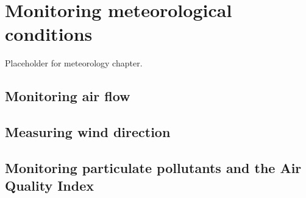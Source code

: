\setchapterpreamble[u]{\margintoc}
\chapter{\color{gray} Monitoring meteorological conditions \color{black}}

Placeholder for meteorology chapter.

\section{\color{gray} Monitoring air flow \color{black}}

\section{\color{gray} Measuring wind direction \color{black}}

\section{\color{gray} Monitoring particulate pollutants and the Air Quality Index \color{black}}
